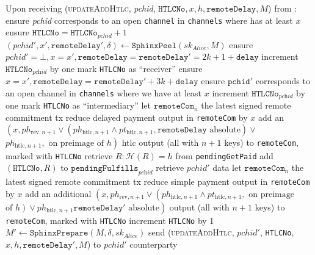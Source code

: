 \begin{algorithmic}[1]
    \State Upon receiving (\textsc{updateAddHtlc}, \textit{pchid},
    $\mathtt{HTLCNo}, x, h, \mathtt{remoteDelay}, M$) from \bob:
    \Indent
      \State ensure \textit{pchid} corresponds to an open \texttt{channel} in
      \texttt{channels} where \bob{} has at least $x$
      \State ensure $\mathtt{HTLCNo} = \mathtt{HTLCNo}_{\mathit{pchid}} + 1$
      \State $\left(\mathit{pchid}', x', \mathtt{remoteDelay}', \delta\right)
      \gets
      \mathtt{SphinxPeel}\left(sk_{\textit{Alice}}, M\right)$
        \State ensure $\mathit{pchid}' = \bot, x = x', \mathtt{remoteDelay} =
        \mathtt{remoteDelay}' = 2k + 1 + \mathtt{delay}$
        \State increment $\mathtt{HTLCNo}_{\textit{pchid}}$ by one
        \State mark \texttt{HTLCNo} as ``receiver''
      \Else {}
        \State ensure $x = x', \mathtt{remoteDelay} = \mathtt{remoteDelay}' + 3k
        + \mathtt{delay}$
        \State ensure $\mathtt{pchid}'$ corresponds to an open channel in
        \texttt{channels} where we have at least $x$
        \State increment $\mathtt{HTLCNo}_{\textit{pchid}}$ by one
        \State mark \texttt{HTLCNo} as ``intermediary''
      \EndIf
      \State let $\mathtt{remoteCom}_n$ the latest signed remote commitment tx
      \State reduce delayed payment output in \texttt{remoteCom} by $x$
      \State add an $\left(x, ph_{\mathrm{rev}, n+1} \vee
      \left(ph_{\mathrm{htlc}, n+1} \wedge pt_{\mathrm{htlc}, n+1},
      \mathtt{remoteDelay} \text{ absolute}\right) \vee\right.$
      $\left.ph_{\mathrm{htlc}, n+1}, \text{ on preimage of } h\right)$ htlc
      output (all with $n+1$ keys) to \texttt{remoteCom}, marked with
      \texttt{HTLCNo}
        \State retrieve $R : \mathcal{H}\left(R\right) = h$ from
        \texttt{pendingGetPaid}
        \State add $\left(\mathtt{HTLCNo}, R\right)$ to
        $\mathtt{pendingFulfills}_{\textit{pchid}}$
       
        \State retrieve $\mathit{pchid}'$ data
        \State let $\mathtt{remoteCom}_n$ the latest signed remote commitment tx
        \State reduce simple payment output in \texttt{remoteCom} by $x$
        \State add an additional $\left(x, ph_{\mathrm{rev}, n+1} \vee
        \left(ph_{\mathrm{htlc}, n+1} \wedge pt_{\mathrm{htlc}, n+1}, \text{ on
        preimage}\right.\right.$ $\left.\left.\text{of } h\right) \vee
        ph_{\mathrm{htlc}, n+1}\mathtt{remoteDelay}' \text{ absolute}\right)$
        output (all with $n+1$ keys) to \texttt{remoteCom}, marked with
        \texttt{HTLCNo}
        \State increment \texttt{HTLCNo} by 1
        \State $M' \gets \mathtt{SphinxPrepare}\left(M, \delta,
        sk_{\mathit{Alice}}\right)$
        \State send (\textsc{updateAddHtlc}, $\mathit{pchid}'$, \texttt{HTLCNo},
        $x, h, \mathtt{remoteDelay}', M$) to $\mathit{pchid}'$ counterparty
      \EndIf
    \EndIndent
    \State


\end{algorithmic}
